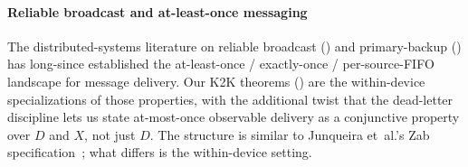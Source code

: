 \paragraph{Reliable broadcast and at-least-once messaging}
The distributed-systems literature on reliable broadcast
(\citet{birman1987process}) and primary-backup
(\citet{junqueira2011zab}) has long-since established the
at-least-once / exactly-once / per-source-FIFO landscape for
message delivery.  Our K2K theorems
() are the within-device specializations
of those properties, with the additional twist that the dead-letter
discipline lets us state at-most-once observable delivery as a
conjunctive property over \(D\) and \(X\), not just \(D\).  The
\TLA{} structure is similar to Junqueira et~al.'s Zab
specification~\citep{junqueira2011zab}; what differs is the
within-device setting.
